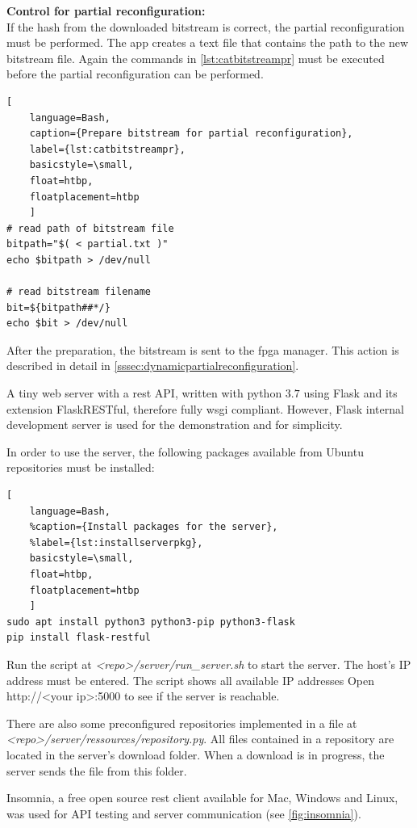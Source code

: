\textbf{Control for partial reconfiguration:}\\
If the hash from the downloaded bitstream is correct, the partial reconfiguration must be performed. The app creates a text file that contains the path to the new bitstream file. Again the commands in \cref{lst:catbitstreampr} must be executed before the partial reconfiguration can be performed. 
\begin{lstlisting}[
	language=Bash,
	caption={Prepare bitstream for partial reconfiguration},
	label={lst:catbitstreampr},
	basicstyle=\small,
	float=htbp,
	floatplacement=htbp
	]
# read path of bitstream file 
bitpath="$( < partial.txt )"
echo $bitpath > /dev/null

# read bitstream filename
bit=${bitpath##*/}
echo $bit > /dev/null
\end{lstlisting}

After the preparation, the bitstream is sent to the \gls{fpga} manager. This action is described in detail in \cref{sssec:dynamicpartialreconfiguration}.

\label{ssssec:server}
A tiny web server with a \gls{rest} API, 
written with python $3.7$ using Flask and its extension FlaskRESTful, therefore fully \gls{wsgi} compliant. However, Flask internal development server is used for the demonstration and for simplicity.

In order to use the server, the following packages available from Ubuntu repositories must be installed: 
\begin{lstlisting}[
	language=Bash,
	%caption={Install packages for the server},
	%label={lst:installserverpkg},
	basicstyle=\small,
	float=htbp,
	floatplacement=htbp
	]
sudo apt install python3 python3-pip python3-flask
pip install flask-restful 
\end{lstlisting}

Run the script at \emph{<repo>/server/run\_server.sh} to start the server. The host's IP address must be entered. The script shows all available IP addresses
Open http://<your ip>:5000 to see if the server is reachable.

There are also some preconfigured repositories implemented in a file at \emph{<repo>/server/ressources/repository.py}.
All files contained in a repository are located in the server's download folder. When a download is in progress, the server sends the file from this folder.

\label{ssssec:serverapi}
Insomnia, a free open source \gls{rest} client available for Mac, Windows and Linux, was used for API testing and server communication (see \cref{fig:insomnia}).

